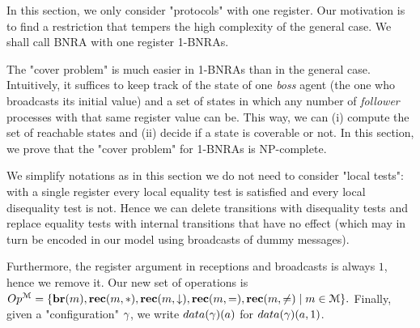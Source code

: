 	In this section, we only consider "protocols" with one register. Our motivation is to find a restriction that tempers the high complexity of the general case. We shall call BNRA with one register 1-BNRAs.

	The "cover problem" is much easier in 1-BNRAs than in the general case. Intuitively, it suffices to keep track of the state of one \emph{boss} agent (the one who broadcasts its initial value) and a set of states in which any number of \emph{follower} processes with that same register value can be. This way, we can (i) compute the set of reachable states and (ii) decide if a state is coverable or not. In this section, we prove that the "cover problem" for 1-BNRAs is NP-complete.

	We simplify notations as in this section we do not need to consider "local tests": with a single register every local equality test is satisfied and every local disequality test is not.
	Hence we can delete transitions with disequality tests and replace equality tests with internal transitions that have no effect (which may in turn be encoded in our model using broadcasts of dummy messages). 
	 
	Furthermore, the register argument in receptions and broadcasts is always $1$, hence we remove it.
	Our new set of operations is 
	$
	Op^{\mathcal{M}} = \{\textbf{br}(m), \textbf{rec}(m, {*}), \textbf{rec}(m, \downarrow), \textbf{rec}(m, {=}), \textbf{rec}(m, {\ne}) \mid m \in \mathcal{M}\}.
	$
	Finally, given a "configuration" $\gamma$, we write $\data{\config}(a)$ for $\data{\config}(a,1)$. 

		



